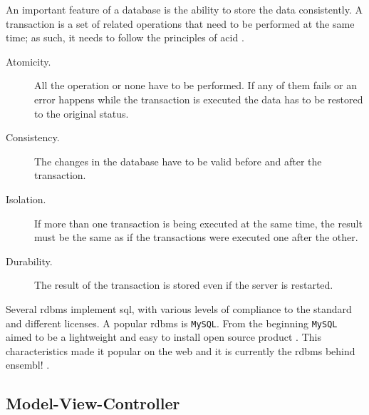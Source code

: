 An important feature of a database is the ability to store the 
data consistently.
A transaction is a set of related operations that need to be performed at the same time; as such, it needs to follow the principles of \gls{acid} \citep{Haerder1983}.


\begin{description}
\item[Atomicity.] All the operation or none have to be performed. If any of them fails or an error happens while the transaction is executed the data has to be restored to the original status. 
\item[Consistency.] The changes in the database have to be valid before and after the transaction. 
\item[Isolation.] If more than one transaction is being executed at the same time, the result must be the same as if the transactions were executed one after the other. 
\item[Durability.] The result of the transaction is stored even if the server is restarted.
\end{description}  


Several \gls{rdbms} implement \acrshort{sql}, with various levels of compliance to the standard and different licenses.  
A popular \acrshort{rdbms} is \texttt{MySQL}.
From the beginning \texttt{MySQL} aimed to be a lightweight and easy to install open source product \citep{Oracle2014}. 
This characteristics made it popular on the web and it is currently the \gls{rdbms} behind ensembl! \citep{Flicek2012}. 

\subsection{Model-View-Controller}

